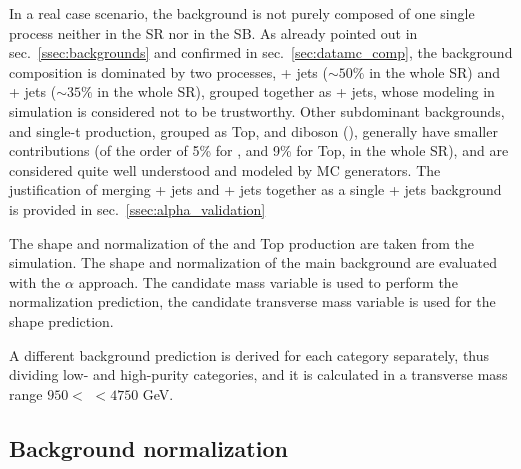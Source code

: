 \noindent In a real case scenario, the background is not purely composed of one single process neither in the SR nor in the SB. As already pointed out in sec.~\ref{ssec:backgrounds} and confirmed in sec.~\ref{sec:datamc_comp}, the background composition is dominated by two processes, \Z + jets ($\sim 50\%$ in the whole SR) and \W + jets ($\sim 35\%$ in the whole SR), grouped together as \V + jets, whose modeling in simulation is considered not to be trustworthy. Other subdominant backgrounds, \ttbar and single-t production, grouped as Top, and diboson (\VV), generally have smaller contributions (of the order of 5\% for \VV, and 9\% for Top, in the whole SR), and are considered quite well understood and modeled by MC generators. The justification of merging \W + jets and \Z + jets together as a single \V + jets background is provided in sec.~\ref{ssec:alpha_validation}

\noindent The shape and normalization of the \VV and Top production are taken from the simulation. %
The shape and normalization of the main background are evaluated with the $\alpha$ approach. The \V candidate mass variable is used to perform the normalization prediction, the \VZ candidate transverse mass variable is used for the shape prediction.


\noindent A different background prediction is derived for each category separately, thus dividing low- and high-purity categories, and it is calculated in a transverse mass range $950 <$ \mtVZ $<4750$ GeV.

\subsection{Background normalization}\label{ssec:alphaNorm}

